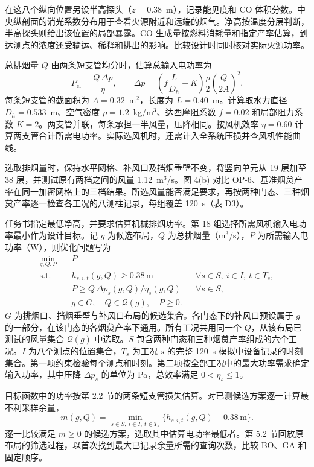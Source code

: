 在这八个纵向位置另设半高探头（$z=0.38$~m），记录能见度和 CO 体积分数。中央纵剖面的消光系数分布用于查看火源附近和远端的烟气。净高按温度分层判断，半高探头则给出该位置的局部暴露。CO 生成量按燃料消耗量和指定产率估算，到达测点的浓度还受输运、稀释和排出的影响。比较设计时同时核对实际火源功率。

总排烟量 $Q$ 由两条短支管均分时，估算总输入电功率为
\[
 P_{\mathrm{el}}=\frac{Q\,\Delta p}{\eta},\qquad
 \Delta p=\left(f\frac{L}{D_h}+K\right)\frac{\rho}{2}
                 \left(\frac{Q}{2A}\right)^2 .
\]
每条短支管的截面积为 $A=0.32$~m$^2$，长度为 $L=0.40$~m。计算取水力直径 $D_h=0.533$~m、空气密度 $\rho=1.2$~kg/m$^3$、达西摩阻系数 $f=0.02$ 和局部阻力系数 $K=2$。两支管并联，每条承担一半风量，压降相同。按风机效率 $\eta=0.60$ 计算两支管合计所需电功率。实际选风机时，还需计入全系统压损并查风机性能曲线。

选取排烟量时，保持水平网格、补风口及挡烟垂壁不变，将竖向单元从 19 层加至 38 层，并测试原有两档之间的风量 1.12~m$^3$/s。图 4(b) 对比 OP-6、基准烟炱产率在同一加密网格上的三档结果。所选风量能否满足要求，再按两种门态、三种烟炱产率逐一检查各工况的八测柱记录，每组覆盖 120~s（表 D3）。

\clearpage
{}
任务书指定最低净高，并要求估算机械排烟功率。第 18 组选择所需风机输入电功率最小作为设计目标。记 $g$ 为候选布局，$Q$ 为总排烟量（m$^3$/s），$P$ 为所需输入电功率（W），则优化问题写为
\begin{equation}
\begin{aligned}
\min_{g,Q,P}\quad &P\\
\mathrm{s.t.}\quad
 &h_{s,i,t}(g,Q)\geq 0.38\,\mathrm{m}
       &&\forall s\in S,\ i\in I,\ t\in T_s,\\
 &P\geq Q\,\Delta p_s(g,Q)/\eta_s(g,Q)
       &&\forall s\in S,\\
 &g\in G,\quad Q\in\mathcal Q(g),\quad P\geq0 .
\end{aligned}
\label{eq:design}
\end{equation}
$G$ 为排烟口、挡烟垂壁与补风口布局的候选集合。各门态下的补风口预设属于 $g$ 的一部分，在该门态的各烟炱产率下通用。所有工况共用同一个 $Q$，从该布局已测试的风量集合 $\mathcal Q(g)$ 中选取。$S$ 包含两种门态和三种烟炱产率组成的六个工况。$I$ 为八个测点的位置集合，$T_s$ 为工况 $s$ 的完整 120~s 模拟中设备记录的时刻集合。第一项约束检验每个测点和时刻。第二项按全部工况中的最大功率需求确定输入功率，其中压降 $\Delta p_s$ 的单位为 Pa，总效率满足 $0<\eta_s\leq1$。

目标函数中的功率按第 2.2 节的两条短支管损失估算。对已测候选方案逐一计算最不利采样余量，
\[
m(g,Q)=\min_{s\in S,\ i\in I,\ t\in T_s}
           \{h_{s,i,t}(g,Q)-0.38\,\mathrm{m}\}.
\]
逐一比较满足 $m\geq0$ 的候选方案，选取其中估算电功率最低者。第 5.2 节回放原布局的筛选过程，以首次找到最大已记录余量所需的查询次数，比较 BO、GA 和固定顺序。
